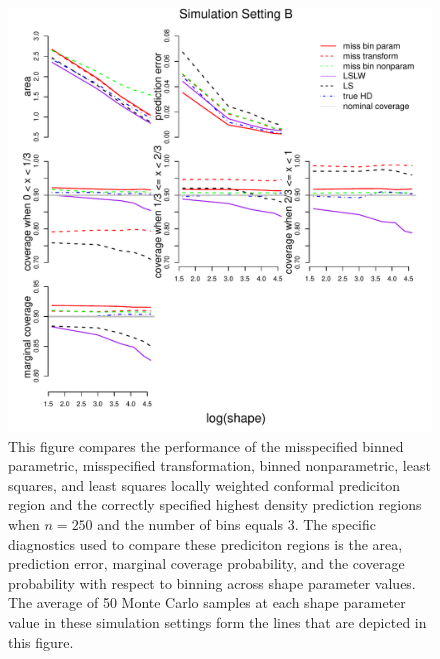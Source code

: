 \documentclass[11pt]{article}\usepackage[]{graphicx}\usepackage[]{color}
\makeatletter
\def\maxwidth{ %
  \ifdim\Gin@nat@width>\linewidth
    \linewidth
  \else
    \Gin@nat@width
  \fi
}
\newenvironment{knitrout}{}{} %
\makeatother
\begin{document}
\newpage
\begin{figure}[h!]
\begin{center}
\begin{knitrout}
\color{fgcolor}
\includegraphics[width=\maxwidth]{figure/Fig-misspec-250-1} 

\end{knitrout}
\end{center}
\caption{This figure compares the performance of the 
  misspecified binned parametric,
  misspecified transformation, 
  binned nonparametric,
  least squares, and 
  least squares locally weighted conformal prediciton region and the 
  correctly specified highest density prediction regions when $n = 250$ 
  and the number of bins equals 3.  
  The specific diagnostics used to compare these prediciton regions is the 
    area,
    prediction error, 
    marginal coverage probability,     
    and the coverage probability with respect to binning 
    across shape parameter values.
  The average of 50 Monte Carlo samples at each shape parameter value in 
  these simulation settings form the lines that are depicted in this figure.}
\label{Fig:misspec.250}
\end{figure}
\end{document}

